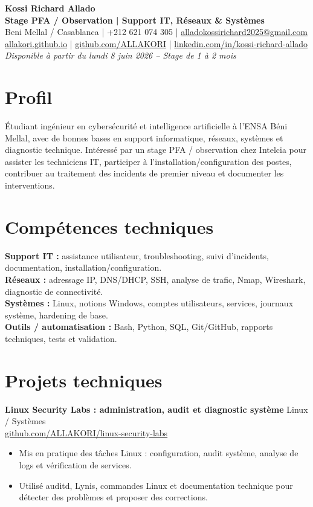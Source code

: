 \documentclass[10pt,a4paper]{article}
\begin{document}
\begin{center}
{\LARGE \textbf{Kossi Richard Allado}}\\[2pt]
{\large \textbf{Stage PFA / Observation | Support IT, Réseaux \& Systèmes}}\\[4pt]
Beni Mellal / Casablanca \quad | \quad +212 621 074 305 \quad | \quad \href{mailto:alladokossirichard2025@gmail.com}{alladokossirichard2025@gmail.com}\\[2pt]
\href{https://allakori.github.io/}{allakori.github.io} \quad | \quad \href{https://github.com/ALLAKORI}{github.com/ALLAKORI} \quad | \quad \href{https://www.linkedin.com/in/kossi-richard-allado-50177b2a5}{linkedin.com/in/kossi-richard-allado}\\[3pt]
\textit{Disponible à partir du lundi 8 juin 2026 -- Stage de 1 à 2 mois}
\end{center}
\vspace{-3pt}

\section{Profil}
Étudiant ingénieur en cybersécurité et intelligence artificielle à l'ENSA Béni Mellal, avec de bonnes bases en support informatique, réseaux, systèmes et diagnostic technique. Intéressé par un stage PFA / observation chez Intelcia pour assister les techniciens IT, participer à l'installation/configuration des postes, contribuer au traitement des incidents de premier niveau et documenter les interventions.

\section{Compétences techniques}
\textbf{Support IT :} assistance utilisateur, troubleshooting, suivi d'incidents, documentation, installation/configuration.\\
\textbf{Réseaux :} adressage IP, DNS/DHCP, SSH, analyse de trafic, Nmap, Wireshark, diagnostic de connectivité.\\
\textbf{Systèmes :} Linux, notions Windows, comptes utilisateurs, services, journaux système, hardening de base.\\
\textbf{Outils / automatisation :} Bash, Python, SQL, Git/GitHub, rapports techniques, tests et validation.

\section{Projets techniques}
\textbf{Linux Security Labs : administration, audit et diagnostic système} \hfill Linux / Systèmes\\
\href{https://github.com/ALLAKORI/linux-security-labs}{github.com/ALLAKORI/linux-security-labs}
\begin{itemize}
  \item Mis en pratique des tâches Linux : configuration, audit système, analyse de logs et vérification de services.
  \item Utilisé auditd, Lynis, commandes Linux et documentation technique pour détecter des problèmes et proposer des corrections.
\end{itemize}
\end{document}
